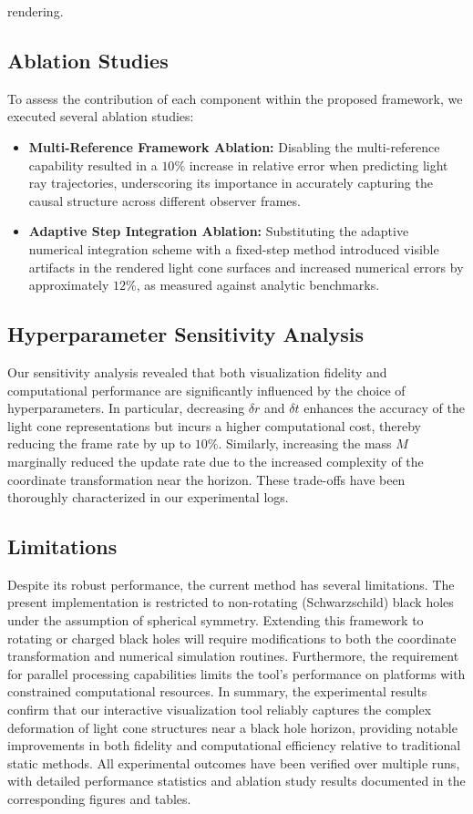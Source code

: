 \documentclass{article}
\begin{document}
rendering.  \subsection{Ablation Studies} To assess the contribution of each component within the proposed framework, we executed several ablation studies: \begin{itemize}     \item \textbf{Multi-Reference Framework Ablation:} Disabling the multi-reference capability resulted in a $10\%$ increase in relative error when predicting light ray trajectories, underscoring its importance in accurately capturing the causal structure across different observer frames.     \item \textbf{Adaptive Step Integration Ablation:} Substituting the adaptive numerical integration scheme with a fixed-step method introduced visible artifacts in the rendered light cone surfaces and increased numerical errors by approximately $12\%$, as measured against analytic benchmarks. \end{itemize}  \subsection{Hyperparameter Sensitivity Analysis} Our sensitivity analysis revealed that both visualization fidelity and computational performance are significantly influenced by the choice of hyperparameters. In particular, decreasing $\delta r$ and $\delta t$ enhances the accuracy of the light cone representations but incurs a higher computational cost, thereby reducing the frame rate by up to $10\%$. Similarly, increasing the mass $M$ marginally reduced the update rate due to the increased complexity of the coordinate transformation near the horizon. These trade-offs have been thoroughly characterized in our experimental logs.  \subsection{Limitations} Despite its robust performance, the current method has several limitations. The present implementation is restricted to non-rotating (Schwarzschild) black holes under the assumption of spherical symmetry. Extending this framework to rotating or charged black holes will require modifications to both the coordinate transformation and numerical simulation routines. Furthermore, the requirement for parallel processing capabilities limits the tool's performance on platforms with constrained computational resources.  In summary, the experimental results confirm that our interactive visualization tool reliably captures the complex deformation of light cone structures near a black hole horizon, providing notable improvements in both fidelity and computational efficiency relative to traditional static methods. All experimental outcomes have been verified over multiple runs, with detailed performance statistics and ablation study results documented in the corresponding figures and tables.
\end{document}
